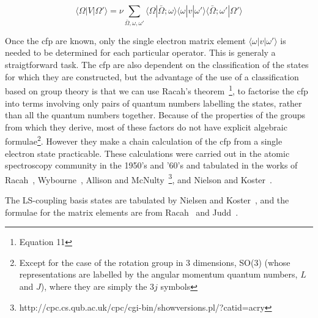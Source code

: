 \[ \langle\Omega|V|\Omega'\rangle = \nu \sum_{\bar{\Omega},\omega,\omega'} \langle\Omega|\bar{\Omega};\omega\rangle
                                         \langle\omega|v|\omega'\rangle \langle\bar{\Omega};\omega'|\Omega'\rangle \]

\noindent Once the cfp are known, only the single electron matrix element $\langle\omega|v|\omega'\rangle$ 
is needed to be determined for each particular operator. This is generaly a straigtforward task. The
cfp are also dependent on the classification of the states for which they are constructed, but the
advantage of the use of a classification based on group theory is that we can use Racah's
theorem~\cite{racah49-1352}\footnote{Equation 11}, to factorise the cfp into terms involving only
pairs of quantum numbers labelling the states, rather than all the quantum numbers together. Because
of the properties of the groups from which they derive, most of these factors do not have explicit
algebraic formulae\footnote{Except for the case of the rotation group in 3 dimensions, SO(3) (whose
representations are labelled by the angular momentum quantum numbers, $L$ and $J$), where they are
simply the $3j$ symbols}. However they make a chain calculation of the cfp from a single electron
state practicable. These calculations were carried out in the atomic spectroscopy community in the
1950's and '60's and tabulated in the works of Racah~\cite{racah49-1352}, Wybourne~\cite{wybourne61}, 
Allison and McNulty~\cite{allison74}\footnote{http://cpc.cs.qub.ac.uk/cpc/cgi-bin/showversions.pl/?catid=acry},
and Nielson and Koster~\cite{nielson63-1}.

The LS-coupling basis states are tabulated by Nielsen and Koster~\cite{nielson63-1}, and the
formulae for the matrix elements are from Racah~\cite{racah42-186,racah42-438,racah43-367}
 and Judd~\cite{judd88-1}.



